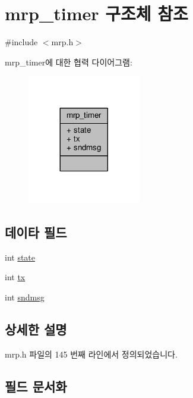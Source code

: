 \hypertarget{structmrp__timer}{}\section{mrp\+\_\+timer 구조체 참조}
\label{structmrp__timer}


{\ttfamily \#include $<$mrp.\+h$>$}



mrp\+\_\+timer에 대한 협력 다이어그램\+:
\nopagebreak
\begin{figure}[H]
\begin{center}
\leavevmode
\includegraphics[width=140pt]{structmrp__timer__coll__graph}
\end{center}
\end{figure}
\subsection*{데이타 필드}
\begin{DoxyCompactItemize}
\item 
int \hyperlink{structmrp__timer_a89f234133d3efe315836311cbf21c64b}{state}
\item 
int \hyperlink{structmrp__timer_a40590f55f82df430f8035df8dd4f03c2}{tx}
\item 
int \hyperlink{structmrp__timer_ab5da457547f90222856e97e186840f16}{sndmsg}
\end{DoxyCompactItemize}


\subsection{상세한 설명}


mrp.\+h 파일의 145 번째 라인에서 정의되었습니다.



\subsection{필드 문서화}
